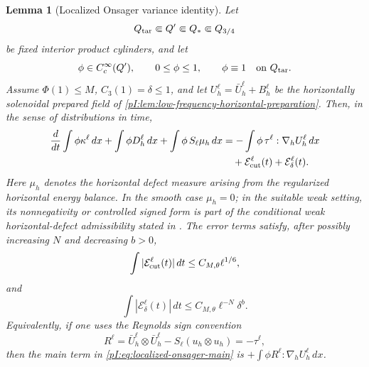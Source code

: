 \documentclass[11pt]{article}
\numberwithin{equation}{section}
\theoremstyle{plain}
\newtheorem{lemma}{Lemma}[section]
\theoremstyle{definition}
\theoremstyle{remark}
\newcommand{\nabh}{\nabla_h}
\begin{document}
\begin{lemma}[Localized Onsager variance identity]\label{pI:lem:localized-onsager-variance}
Let
\[
        Q_{\rm tar}\Subset Q'\Subset Q_*\Subset Q_{3/4}
\]
be fixed interior product cylinders, and let
\[
        \phi\in C_c^\infty(Q'),\qquad 0\le \phi\le 1,
        \qquad \phi\equiv1\quad\text{on }Q_{\rm tar}.
\]
Assume \(\Phi(1)\le M\), \(C_3(1)=\delta\le1\), and let \(U_h^\ell=\bar U_h^\ell+B_h^\ell\) be the horizontally solenoidal prepared field of \cref{pI:lem:low-frequency-horizontal-preparation}.  Then, in the sense of distributions in time,
\begin{equation}\label{pI:eq:localized-onsager-main}
\begin{aligned}
        \frac{d}{dt}\int \phi\kappa^\ell\,dx
        +\int \phi D_h^\ell\,dx
        +\int \phi\,S_\ell\mu_h\,dx
        &=-\int \phi\,\tau^\ell:\nabh U_h^\ell\,dx  \\
        &\quad+\mathcal E_{\rm cut}^\ell(t)+\mathcal E_\delta^\ell(t).
\end{aligned}
\end{equation}
Here \(\mu_h\) denotes the horizontal defect measure arising from the regularized horizontal energy balance.  In the smooth case \(\mu_h=0\); in the suitable weak setting, its nonnegativity or controlled signed form is part of the conditional weak horizontal-defect admissibility stated in .  The error terms satisfy, after possibly increasing \(N\) and decreasing \(b>0\),
\begin{equation}\label{pI:eq:onsager-cut-error}
        \int |\mathcal E_{\rm cut}^\ell(t)|\,dt
        \le C_{M,\theta}\ell^{1/6},
\end{equation}
and
\begin{equation}\label{pI:eq:onsager-delta-error}
        \int |\mathcal E_\delta^\ell(t)|\,dt
        \le C_{M,\theta}\ell^{-N}\delta^b.
\end{equation}
Equivalently, if one uses the Reynolds sign convention
\[
        R^\ell=\bar U_h^\ell\otimes\bar U_h^\ell-S_\ell(u_h\otimes u_h)=-\tau^\ell,
\]
then the main term in \eqref{pI:eq:localized-onsager-main} is \(+\int\phi R^\ell:\nabh U_h^\ell\,dx\).
\end{lemma}
\end{document}
